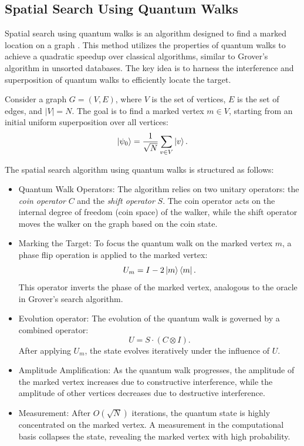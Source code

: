 \documentclass{article}
\begin{document}
		\subsection{Spatial Search Using Quantum Walks}

			Spatial search using quantum walks is an algorithm designed to find a marked location on a graph \cite{portugal}. This method utilizes the properties of quantum walks to achieve a quadratic speedup over classical algorithms, similar to Grover's algorithm in unsorted databases. The key idea is to harness the interference and superposition of quantum walks to efficiently locate the target.

			Consider a graph \( G = (V, E) \), where \( V \) is the set of vertices, \( E \) is the set of edges, and \( |V| = N \). The goal is to find a marked vertex \( m \in V \), starting from an initial uniform superposition over all vertices:
			\[
			\ket{\psi_0} = \frac{1}{\sqrt{N}} \sum_{v \in V} \ket{v}.
			\]

			The spatial search algorithm using quantum walks is structured as follows:

			\begin{itemize}
				\item Quantum Walk Operators: The algorithm relies on two unitary operators: the \textit{coin operator} \( C \) and the \textit{shift operator} \( S \). The coin operator acts on the internal degree of freedom (coin space) of the walker, while the shift operator moves the walker on the graph based on the coin state.

				\item Marking the Target: To focus the quantum walk on the marked vertex \( m \), a phase flip operation is applied to the marked vertex:
				\[
				U_m = I - 2\ket{m}\bra{m}.
				\]
				This operator inverts the phase of the marked vertex, analogous to the oracle in Grover's search algorithm.

				\item Evolution operator: The evolution of the quantum walk is governed by a combined operator:
				\[
				U = S \cdot (C \otimes I).
				\]
				After applying \( U_m \), the state evolves iteratively under the influence of \( U \).

				\item Amplitude Amplification: As the quantum walk progresses, the amplitude of the marked vertex increases due to constructive interference, while the amplitude of other vertices decreases due to destructive interference.

				\item Measurement: After \( O(\sqrt{N}) \) iterations, the quantum state is highly concentrated on the marked vertex. A measurement in the computational basis collapses the state, revealing the marked vertex with high probability.
			\end{itemize}
\end{document}
